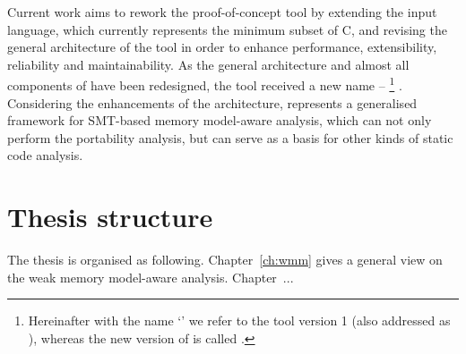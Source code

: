 
Current work aims to rework the proof-of-concept tool \porthos{} by extending the input language, which currently represents the minimum subset of C, and revising the general architecture of the tool in order to enhance performance, extensibility, reliability and maintainability.
As the general architecture and almost all components of \porthos{} have been redesigned, the tool received a new name -- \porthos[2]%
\footnote{Hereinafter with the name `\porthos' we refer to the tool \porthos{} version 1 (also addressed as \porthos[1]), whereas the new version of \porthos{} is called \porthos[2].} %
. Considering the enhancements of the architecture, \porthos[2] represents a generalised framework for SMT-based memory model-aware analysis, which can not only perform the portability analysis, but can serve as a basis for other kinds of static code analysis.


\section{Thesis structure}
\label{ch:intro:structure}

The thesis is organised as following. Chapter~\ref{ch:wmm} gives a general view on the weak memory model-aware analysis. Chapter~...


